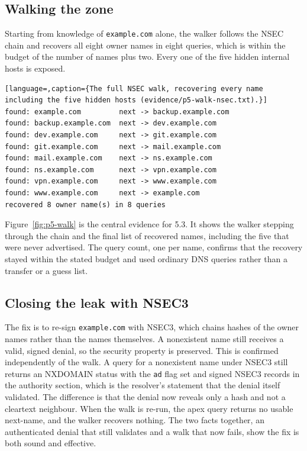 \documentclass[11pt]{article}
\begin{document}
\subsection{Walking the zone}

Starting from knowledge of \texttt{example.com} alone, the walker follows the NSEC
chain and recovers all eight owner names in eight queries, which is within the
budget of the number of names plus two. Every one of the five hidden internal
hosts is exposed.

\begin{lstlisting}[language=,caption={The full NSEC walk, recovering every name including the five hidden hosts (evidence/p5-walk-nsec.txt).}]
found: example.com         next -> backup.example.com
found: backup.example.com  next -> dev.example.com
found: dev.example.com     next -> git.example.com
found: git.example.com     next -> mail.example.com
found: mail.example.com    next -> ns.example.com
found: ns.example.com      next -> vpn.example.com
found: vpn.example.com     next -> www.example.com
found: www.example.com     next -> example.com
recovered 8 owner name(s) in 8 queries
\end{lstlisting}


Figure~\ref{fig:p5-walk} is the central evidence for 5.3. It
shows the walker stepping through the chain and the final list of recovered
names, including the five that were never advertised. The query count, one per
name, confirms that the recovery stayed within the stated budget and used ordinary
DNS queries rather than a transfer or a guess list.

\subsection{Closing the leak with NSEC3}

The fix is to re-sign \texttt{example.com} with NSEC3, which chains hashes of the
owner names rather than the names themselves. A nonexistent name still receives a
valid, signed denial, so the security property is preserved. This is confirmed
independently of the walk. A query for a nonexistent name under NSEC3 still returns
an NXDOMAIN status with the \texttt{ad} flag set and signed NSEC3 records in the
authority section, which is the resolver's statement that the denial itself
validated. The difference is that the denial now reveals only a hash and not a
cleartext neighbour. When the walk is re-run, the apex query returns no usable
next-name, and the walker recovers nothing. The two facts together, an authenticated
denial that still validates and a walk that now fails, show the fix is both sound and
effective.
\end{document}
